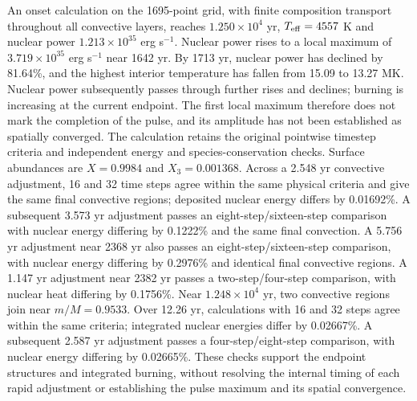 \documentclass[11pt,letterpaper]{article}
\begin{document}
An onset calculation on the 1695-point grid, with finite composition
transport throughout all convective layers, reaches $1.250\times10^4$ yr,
$T_{\rm eff}=4557$ K and nuclear power $1.213\times10^{35}$ erg s$^{-1}$.
Nuclear power rises to a local maximum of $3.719\times10^{35}$ erg s$^{-1}$
near 1642 yr. By 1713 yr, nuclear power has declined by 81.64\%, and the
highest interior temperature has fallen from 15.09 to 13.27 MK. Nuclear power
subsequently passes through further rises and declines; burning is increasing
at the current endpoint.
The first local maximum therefore does not mark the completion of the pulse,
and its amplitude has not been established as spatially converged.
The calculation retains the original pointwise timestep criteria and independent
energy and species-conservation checks. Surface abundances are $X=0.9984$ and
$X_3=0.001368$. Across a 2.548 yr convective adjustment, 16 and 32 time steps
agree within the same physical criteria and give the same final convective
regions; deposited nuclear energy differs by 0.01692\%. A subsequent
3.573 yr adjustment passes an eight-step/sixteen-step comparison with
nuclear energy differing by 0.1222\% and the same final convection.
A 5.756 yr adjustment near 2368 yr also passes an eight-step/sixteen-step
comparison, with nuclear energy differing by 0.2976\% and identical final
convective regions. A 1.147 yr adjustment near 2382 yr passes a two-step/four-step
comparison, with nuclear heat differing by 0.1756\%.
Near $1.248\times10^4$ yr, two convective regions join near $m/M=0.9533$.
Over 12.26 yr, calculations with 16 and 32 steps agree within the same
criteria; integrated nuclear energies differ by 0.02667\%. A subsequent
2.587 yr adjustment passes a four-step/eight-step comparison, with nuclear
energy differing by 0.02665\%. These checks support the
endpoint structures and integrated burning,
without resolving the internal timing of each rapid adjustment or
establishing the pulse maximum and its spatial convergence.
\end{document}
